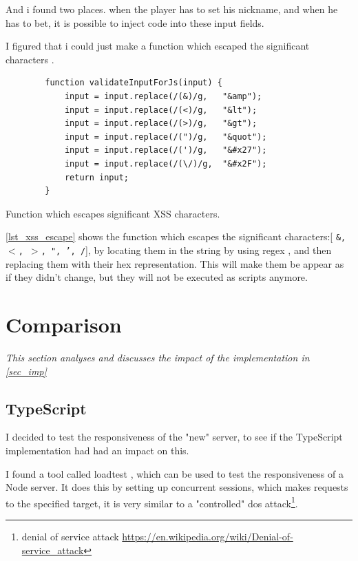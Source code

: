 \documentclass[a4paper]{article}
\begin{document}
And i found two places. when the player has to set his nickname, and when he has to bet, it is possible to inject code into these input fields.

I figured that i could just make a function which escaped the significant characters \cite{xss-prep}.

\begin{listing}[H]
\begin{verbatim}
        function validateInputForJs(input) {
            input = input.replace(/(&)/g,   "&amp");
            input = input.replace(/(<)/g,   "&lt");
            input = input.replace(/(>)/g,   "&gt");
            input = input.replace(/(")/g,   "&quot");
            input = input.replace(/(')/g,   "&#x27");
            input = input.replace(/(\/)/g,  "&#x2F");
            return input;
        }
\end{verbatim}
\caption{Function which escapes significant XSS characters.}
\label{lst_xss_escape}
\end{listing}

\autoref{lst_xss_escape} shows the function which escapes the significant characters:[ \texttt{\&, $<$, $>$, ", ', /}], by locating them in the string by using regex \cite{regex}, and then replacing them with their hex representation. This will make them be appear as if they didn't change, but they will not be executed as scripts anymore.




\section{Comparison}
\textit{This section analyses and discusses the impact of the implementation in \autoref{sec_imp}}


\subsection{TypeScript}

I decided to test the responsiveness of the "new" server, to see if the TypeScript implementation had had an impact on this.

I found a tool called loadtest \cite{loadtest}, which can be used to test the responsiveness of a Node server. It does this by setting up concurrent sessions, which makes requests to the specified target, it is very similar to a "controlled" dos attack\footnote{denial of service attack \url{https://en.wikipedia.org/wiki/Denial-of-service_attack}}.
\end{document}
